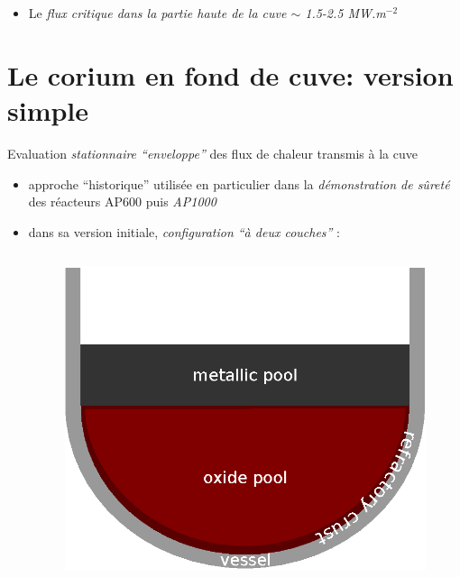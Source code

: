 \begin{frame}[fragile]
\begin{itemize}
\begin{columns}
\begin{column}{0.25\textwidth}
\begin{figure}[H]
\caption{\tiny Corrélation ULPU appliqué à un fond de cuve en calotte sphérique}
\end{figure}
\end{column}
\end{columns}
\item Le \emph{flux critique dans la partie haute de la cuve $\sim$ 1.5-2.5 MW.m$^{-2}$}
\end{itemize}
\end{frame}

\section{Le corium en fond de cuve: version simple}
\begin{frame}[fragile]
Evaluation \emph{stationnaire ``enveloppe''} des flux de chaleur transmis à la cuve
\begin{itemize}
\item approche ``historique'' utilisée en particulier dans la \emph{démonstration de sûreté} des réacteurs AP600 puis \emph{AP1000} \cite{Esmaili2004} 
\item dans sa version initiale, \emph{configuration ``à deux couches''} :
\begin{columns}[T]
    \begin{column}{0.35\textwidth}
      \begin{figure}[H]
\centering \includegraphics[height=0.4\textheight]{Figures/TD_2layer_2.eps}

\end{figure}
\end{column}
\end{columns}
\end{itemize}
\end{frame}
